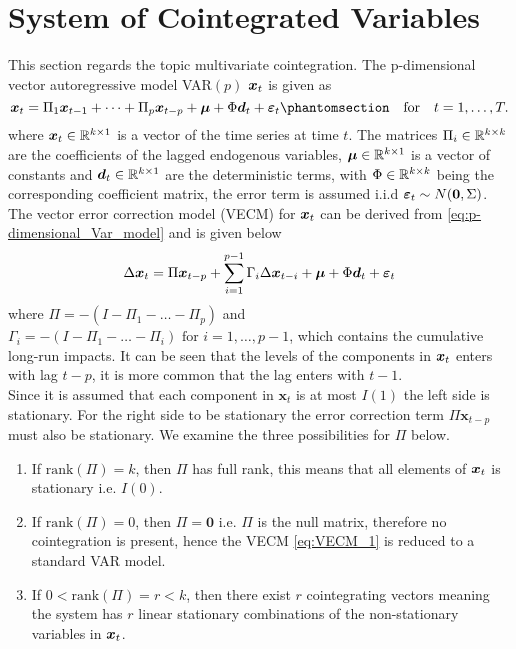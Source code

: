 \section{System of Cointegrated Variables}
This section regards the topic multivariate cointegration. The p-dimensional vector autoregressive model VAR$(p)$ $\boldsymbol{x}_t$ is given as
\begin{equation}
    \boldsymbol{x}_t=\Pi_1 \b{x}_{t-1} + \dots + \Pi_p \b{x}_{t-p} + \b{\mu} + \Phi \boldsymbol{d}_t +\boldsymbol{\varepsilon}_t \phantomsection \:\:\: \text{ for } \:\:\: t=1,\dots,T.
    \label{eq:p-dimensional_Var_model}
\end{equation}
where $\boldsymbol{x}_t \in \mathbb{R}^{k\times 1}$ is a vector of the time series at time $t$. The matrices $\Pi_i\in \mathbb{R}^{k\times k}$ are the coefficients of the lagged endogenous variables, $\boldsymbol{\mu} \in \mathbb{R}^{k\times 1}$ is a vector of constants and $\boldsymbol{d}_t \in \mathbb{R}^{k\times 1}$ are the deterministic terms, with $\Phi \in \mathbb{R}^{k\times k}$ being the corresponding coefficient matrix, the error term is assumed i.i.d $\boldsymbol{\varepsilon}_t \sim N(\boldsymbol{0},\Sigma)$. The vector error correction model (VECM) for $\boldsymbol{x}_t$ can be derived from \eqref{eq:p-dimensional_Var_model} and is given below
\begin{equation}
    \Delta \boldsymbol{x}_t = \Pi \boldsymbol{x}_{t-p} + \sum_{i=1}^{p-1}\Gamma_i\Delta \boldsymbol{x}_{t-i} + \boldsymbol{\mu} + \Phi \boldsymbol{d}_t + \boldsymbol{\varepsilon}_t
    \label{eq:VECM_1}
\end{equation}
where $\Pi=-(I-\Pi_1-\dots-\Pi_p)$ and 
$\Gamma_i=-(I-\Pi_{1}-\dots-\Pi_i) \text{ for } i=1,\dots,p-1$, which contains the cumulative long-run impacts. It can be seen that the levels of the components in $\boldsymbol{x}_t$ enters with lag $t-p$, it is more common that the lag enters with $t-1$.\\
Since it is assumed that each component in $\boldsymbol{x}_t$ is at most $I(1)$ the left side is stationary. For the right side to be stationary the error correction term $\Pi\boldsymbol{x}_{t-p}$ must also be stationary.
We examine the three possibilities for $\Pi$ below.
\begin{enumerate}
    \item If $\text{rank}(\Pi)=k$, then $\Pi$ has full rank, this means that all elements of $\boldsymbol{x}_t$ is stationary i.e. $I(0)$.
    \item If $\text{rank}(\Pi)=0$, then $\Pi=\textbf{0}$ i.e. $\Pi$ is the null matrix, therefore no cointegration is present, hence the VECM \eqref{eq:VECM_1} is reduced to a standard VAR model.
    \item If $0<\text{rank}(\Pi)=r<k$, then there exist $r$ cointegrating vectors meaning the system has $r$ linear stationary combinations of the non-stationary variables in $\boldsymbol{x}_t$.
\end{enumerate}
